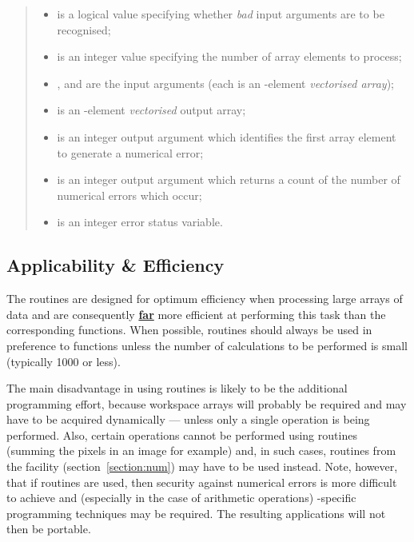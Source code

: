 \begin{quote}
\begin{itemize}

\item {} is a logical value specifying whether {\em bad}
input arguments are to be recognised;

\item {} is an integer value specifying the number of array
elements to process; 

\item {},  and  are the input
arguments (each is an -element {\em vectorised array}); 

\item {} is an -element {\em vectorised} output 
array;

\item {} is an integer output argument which identifies the
first array element to generate a numerical error;

\item {} is an integer output argument which returns a count of the
number of numerical errors which occur;

\item {} is an integer error status variable.

\end{itemize}
\end{quote}

\subsection{Applicability \& Efficiency}

The  routines are designed for optimum efficiency when
processing large arrays of data and are consequently {\bf \underline{far}}
more efficient at performing this task than the corresponding 
functions. 
When possible,  routines should always be used in preference to
 functions unless the number of calculations to be performed is
small (typically 1000 or less). 

The main disadvantage in using  routines is likely to be the
additional programming effort, because workspace arrays will probably be
required and may have to be acquired dynamically --- unless only a single
operation is being performed. 
Also, certain operations cannot be performed using  routines
(summing the pixels in an image for example) and, in such cases,
routines from the  facility (section~\ref{section:num}) may have
to be used instead. 
Note, however, that if  routines are used, then security against 
numerical errors is more difficult to achieve and (especially in the case of
arithmetic operations) -specific programming techniques may be
required.
The resulting applications will not then be portable. 


